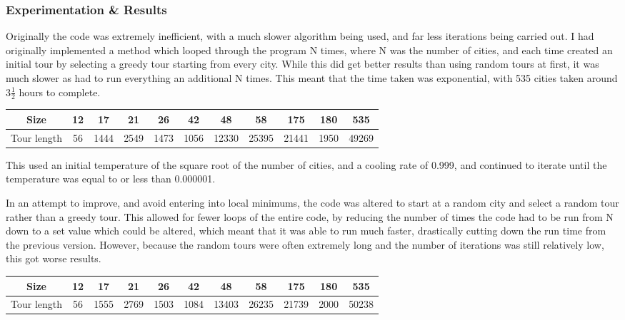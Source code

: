 \documentclass[11pt]{article}
\begin{document}
		\subsubsection*{Experimentation \& Results}
			Originally the code was extremely inefficient, with a much slower algorithm being used, and far less iterations being carried out. I had originally implemented a method which looped through the program N times, where N was the number of cities, and each time created an initial tour by selecting a greedy tour starting from every city. While this did get better results than using random tours at first, it was much slower as had to run everything an additional N times. This meant that the time taken was exponential, with 535 cities taken around 3$ \frac{1}{2} $ hours to complete.
			\begin{center}
				\begin{tabular}{| c | c | c | c | c | c | c | c | c | c | c |}
					\hline
					Size & 12 & 17 & 21 & 26 & 42 & 48 & 58 & 175 & 180 & 535 \\
					\hline
					Tour length & 56 & 1444 & 2549 & 1473 & 1056 & 12330 & 25395 & 21441 & 1950 & 49269 \\
					\hline
				\end{tabular}
			\end{center}
			\par
			This used an initial temperature of the square root of the number of cities, and a cooling rate of 0.999, and continued to iterate until the temperature was equal to or less than 0.000001.
			\par
			In an attempt to improve, and avoid entering into local minimums, the code was altered to start at a random city and select a random tour rather than a greedy tour. This allowed for fewer loops of the entire code, by reducing the number of times the code had to be run from N down to a set value which could be altered, which meant that it was able to run much faster, drastically cutting down the run time from the previous version. However, because the random tours were often extremely long and the number of iterations was still relatively low, this got worse results.
			\begin{center}
				\begin{tabular}{| c | c | c | c | c | c | c | c | c | c | c |}
					\hline
					Size & 12 & 17 & 21 & 26 & 42 & 48 & 58 & 175 & 180 & 535 \\
					\hline
					Tour length & 56 & 1555 & 2769 & 1503 & 1084 & 13403 & 26235 & 21739 & 2000 & 50238 \\
					\hline
				\end{tabular}
			\end{center}
\end{document}
